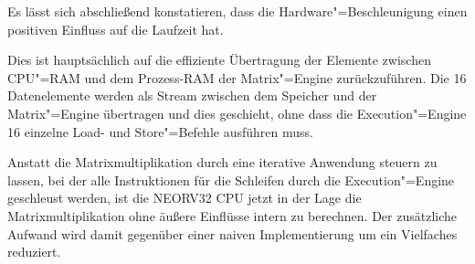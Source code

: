 Es lässt sich abschließend konstatieren, dass die Hardware"=Beschleunigung einen positiven Einfluss auf die Laufzeit hat.

Dies ist hauptsächlich auf die effiziente Übertragung der Elemente zwischen CPU"=RAM und dem Prozess-RAM der Matrix"=Engine zurückzuführen. Die 16 Datenelemente werden als Stream zwischen dem Speicher und der Matrix"=Engine übertragen und dies geschieht, ohne dass die Execution"=Engine 16 einzelne Load- und Store"=Befehle ausführen muss.

Anstatt die Matrixmultiplikation durch eine iterative Anwendung steuern zu lassen, bei der alle Instruktionen für die Schleifen durch die Execution"=Engine geschleust werden, ist die NEORV32 CPU jetzt in der Lage die Matrixmultiplikation ohne äußere Einflüsse intern zu berechnen. Der zusätzliche Aufwand wird damit gegenüber einer naiven Implementierung um ein Vielfaches reduziert.


